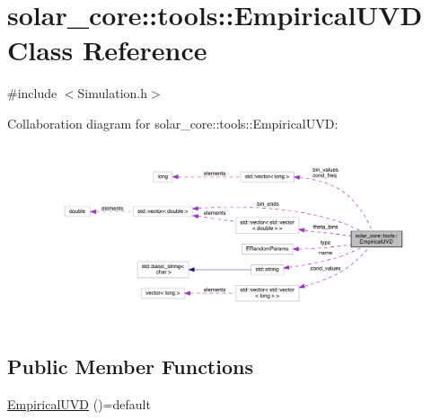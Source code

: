 \hypertarget{classsolar__core_1_1tools_1_1_empirical_u_v_d}{}\section{solar\+\_\+core\+:\+:tools\+:\+:Empirical\+U\+V\+D Class Reference}
\label{classsolar__core_1_1tools_1_1_empirical_u_v_d}


{\ttfamily \#include $<$Simulation.\+h$>$}



Collaboration diagram for solar\+\_\+core\+:\+:tools\+:\+:Empirical\+U\+V\+D\+:
\nopagebreak
\begin{figure}[H]
\begin{center}
\leavevmode
\includegraphics[width=350pt]{classsolar__core_1_1tools_1_1_empirical_u_v_d__coll__graph}
\end{center}
\end{figure}
\subsection*{Public Member Functions}
\begin{DoxyCompactItemize}
\item 
\hyperlink{classsolar__core_1_1tools_1_1_empirical_u_v_d_a3745b987a8d7c7e61d2aabbaf652a3e5}{Empirical\+U\+V\+D} ()=default
\end{DoxyCompactItemize}
